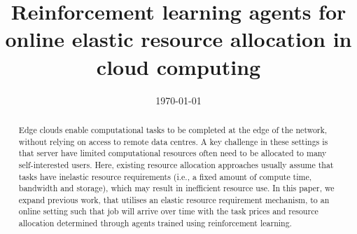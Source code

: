 \documentclass[sotoncolour]{extra/uos_project}     %
\title       {Reinforcement learning agents for online elastic resource allocation in cloud computing}
\date       {\today}
\begin{document}
\frontmatter
\maketitle
\begin{abstract}
Edge clouds enable computational tasks to be completed at the edge of the network, without relying on access to remote
data centres. A key challenge in these settings is that server have limited computational resources often need to be
allocated to many self-interested users. Here, existing resource allocation approaches usually assume that tasks have
inelastic resource requirements (i.e., a fixed amount of compute time, bandwidth and storage), which may result in
inefficient resource use. In this paper, we expand previous work, that utilises an elastic resource requirement
mechanism, to an online setting such that job will arrive over time with the task prices and resource allocation
determined through agents trained using reinforcement learning.
\end{abstract}

\tableofcontents

\end{document}
